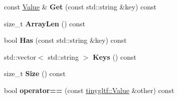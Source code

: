 \begin{DoxyCompactItemize}
const \hyperlink{classtinygltf_1_1Value}{Value} \& {\bfseries Get} (const std\+::string \&key) const
\item 
\mbox{\label{classtinygltf_1_1Value_a6622ae4eb21a3305b1758563f091bd7d}} 
size\+\_\+t {\bfseries Array\+Len} () const
\item 
\mbox{\label{classtinygltf_1_1Value_ab58601c660a189bf125cd4b84a26fe4a}} 
bool {\bfseries Has} (const std\+::string \&key) const
\item 
\mbox{\label{classtinygltf_1_1Value_a3c24cc8cb36960fa79de69bd6257d12c}} 
std\+::vector$<$ std\+::string $>$ {\bfseries Keys} () const
\item 
\mbox{\label{classtinygltf_1_1Value_a4f685b1a08cd39dfec98dd23b3f8304c}} 
size\+\_\+t {\bfseries Size} () const
\item 
\mbox{\label{classtinygltf_1_1Value_a753a59022f5d0cc22bc54eef42343ba7}} 
bool {\bfseries operator==} (const \hyperlink{classtinygltf_1_1Value}{tinygltf\+::\+Value} \&other) const
\end{DoxyCompactItemize}

